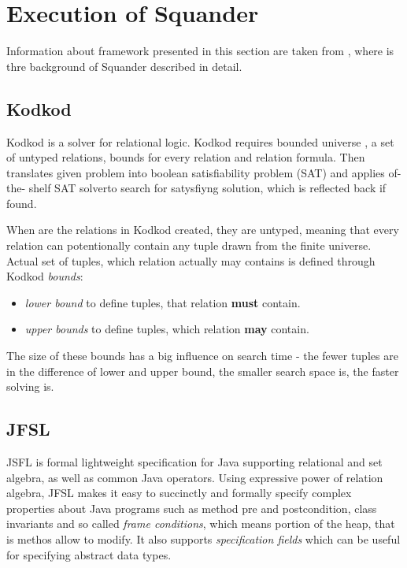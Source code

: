 \documentclass[11pt,twoside,a4paper]{book}
\begin{document}
\section{Execution of Squander}

Information about framework presented in this section are taken from
\cite{milicevic:executableSpecificationsForJavaPrograms}, where is
thre background of Squander described in detail.

\subsection{Kodkod}
Kodkod is a solver for relational logic. Kodkod requires bounded universe , a
set of untyped relations, bounds for every relation and relation formula. Then
translates given problem into boolean satisfiability problem (SAT) and applies
of-the- shelf SAT solverto search for satysfiyng solution, which is reflected
back if found.

When are the relations in Kodkod created, they are untyped, meaning that every
relation can potentionally contain any tuple drawn from the finite universe.
Actual set of tuples, which relation actually may contains is defined through
Kodkod \textit{bounds}:
\begin{itemize}
  \item \textit{lower bound} to define tuples, that relation \textbf{must}
  contain.
  \item \textit{upper bounds} to define tuples, which relation \textbf{may}
  contain.
\end{itemize}

The size of these bounds has a big influence on search time - the fewer tuples
are in the difference of lower and upper bound, the smaller search space is, the
faster solving is.


\subsection{JFSL}
JSFL is formal lightweight specification for Java supporting relational and set
algebra, as well as common Java operators. Using expressive power of relation
algebra, JFSL makes it easy to succinctly and formally specify complex
properties about Java programs such as method pre and postcondition, class
invariants and so called \textit{frame conditions}, which means portion of the
heap, that is methos allow to modify. It also supports \textit{specification
fields} which can be useful for specifying abstract data types. 
\end{document}
